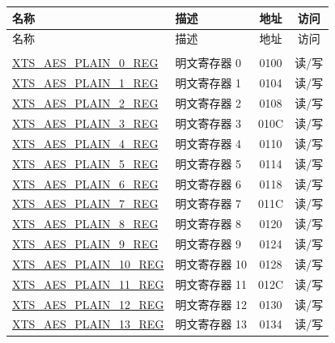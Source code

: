 

\begin{longtable}{ | p{6.0cm} | p{6.6cm} | c | c| }
\hline\rowcolor{lightgray}
名称 & 描述 &  地址 & 访问 \\ \hline
\endfirsthead
        \hline
        \rowcolor{lightgray}
       名称 & 描述 & 地址 & 访问  \\
        \hline
        \endhead
        \endfoot

\multicolumn{4}{|l|}{\textbf{明文寄存器堆}} \\ \hline
\hyperref[regdesc:XTSAESPLAINNREG]{XTS\_AES\_PLAIN\_0\_REG}  & 明文寄存器  0   & \hexprefix{}0100 & 读/写 \\\hline
\hyperref[regdesc:XTSAESPLAINNREG]{XTS\_AES\_PLAIN\_1\_REG} & 明文寄存器  1   & \hexprefix{}0104 & 读/写 \\\hline
\hyperref[regdesc:XTSAESPLAINNREG]{XTS\_AES\_PLAIN\_2\_REG}  & 明文寄存器  2   & \hexprefix{}0108 & 读/写 \\\hline
\hyperref[regdesc:XTSAESPLAINNREG]{XTS\_AES\_PLAIN\_3\_REG}  & 明文寄存器  3   & \hexprefix{}010C & 读/写 \\\hline
\hyperref[regdesc:XTSAESPLAINNREG]{XTS\_AES\_PLAIN\_4\_REG} & 明文寄存器  4   & \hexprefix{}0110 & 读/写 \\\hline
\hyperref[regdesc:XTSAESPLAINNREG]{XTS\_AES\_PLAIN\_5\_REG}   & 明文寄存器  5   & \hexprefix{}0114 & 读/写 \\\hline
\hyperref[regdesc:XTSAESPLAINNREG]{XTS\_AES\_PLAIN\_6\_REG}   & 明文寄存器  6   & \hexprefix{}0118 & 读/写 \\\hline
\hyperref[regdesc:XTSAESPLAINNREG]{XTS\_AES\_PLAIN\_7\_REG}  & 明文寄存器  7   & \hexprefix{}011C & 读/写 \\\hline
\hyperref[regdesc:XTSAESPLAINNREG]{XTS\_AES\_PLAIN\_8\_REG}  & 明文寄存器  8   & \hexprefix{}0120 & 读/写 \\\hline
\hyperref[regdesc:XTSAESPLAINNREG]{XTS\_AES\_PLAIN\_9\_REG}  & 明文寄存器  9   & \hexprefix{}0124 & 读/写 \\\hline
\hyperref[regdesc:XTSAESPLAINNREG]{XTS\_AES\_PLAIN\_10\_REG} & 明文寄存器 10   & \hexprefix{}0128 & 读/写 \\\hline
\hyperref[regdesc:XTSAESPLAINNREG]{XTS\_AES\_PLAIN\_11\_REG} & 明文寄存器 11   & \hexprefix{}012C & 读/写 \\\hline
\hyperref[regdesc:XTSAESPLAINNREG]{XTS\_AES\_PLAIN\_12\_REG}   & 明文寄存器 12   & \hexprefix{}0130 & 读/写 \\\hline
\hyperref[regdesc:XTSAESPLAINNREG]{XTS\_AES\_PLAIN\_13\_REG}  & 明文寄存器 13   & \hexprefix{}0134 & 读/写 \\\hline

\end{longtable}
